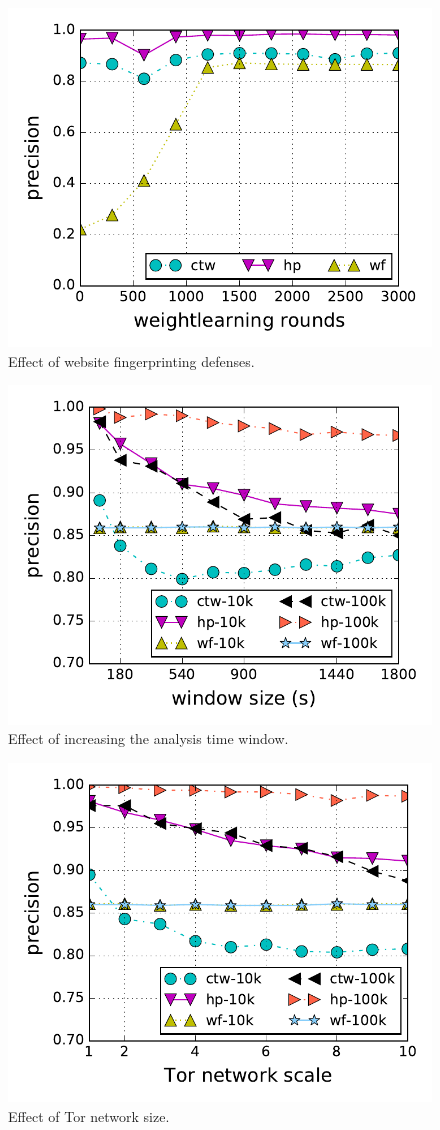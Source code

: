 \begin{figure}[t]
\centering
\includegraphics[width=0.75\linewidth]{figures/wfdns/rounds/1kx100+100k}
\caption{Effect of website fingerprinting defenses.}    
\label{fig:wfdns:var:rounds}
\end{figure}

\begin{figure}[t]
\centering
\includegraphics[width=0.75\linewidth]{figures/wfdns/window/1kx100+100k}
\caption{Effect of increasing the analysis time window.}
    \label{fig:wfdns:var:window}
\end{figure}



\begin{figure}[t]
\centering
	\includegraphics[width=0.75\linewidth]{figures/wfdns/scale/1kx100+100k}
\caption{Effect of Tor network size.}
\label{fig:wfdns:var:scale}
\end{figure}


